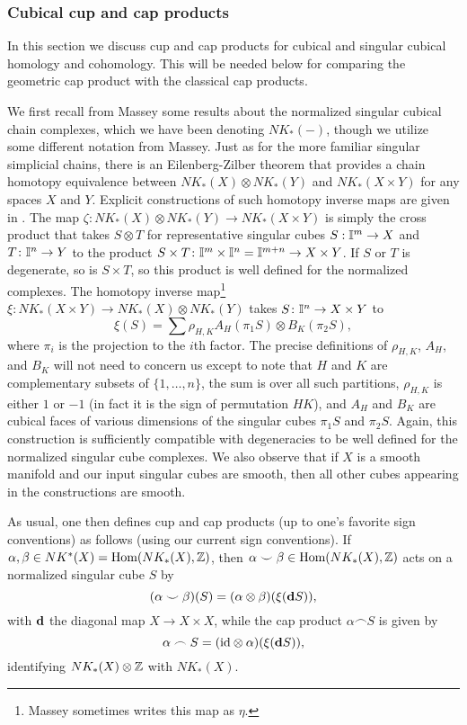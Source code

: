 \subsubsection{Cubical cup and cap products}\label{S: cubical products}

In this section we discuss cup and cap products for cubical and singular cubical homology and cohomology.
This will be needed below for comparing the geometric cap product with the classical cap products.

We first recall from Massey \cite[Chapter XI]{Mas91} some results about the normalized singular cubical chain complexes, which we have been denoting $NK_*(-)$, though we utilize some different notation from Massey.
Just as for the more familiar singular simplicial chains, there is an Eilenberg-Zilber theorem that provides a chain homotopy equivalence between $NK_*(X) \otimes NK_*(Y)$ and $NK_*(X \times Y)$ for any spaces $X$ and $Y$.
Explicit constructions of such homotopy inverse maps are given in \cite[Section XI.5]{Mas91}.
The map $\zeta: NK_*(X) \otimes NK_*(Y) \to NK_*(X \times Y)$ is simply the cross product that takes $S \otimes T$ for representative singular cubes $S: \mathbb{I}^m \to X$ and $T \colon \mathbb{I}^n \to Y$ to the product $S \times T \colon \mathbb{I}^m \times \mathbb{I}^n = \mathbb{I}^{m+n} \to X \times Y$.
If $S$ or $T$ is degenerate, so is $S \times T$, so this product is well defined for the normalized complexes.
The homotopy inverse map\footnote{Massey sometimes writes this map as $\eta$.} $\xi: NK_*(X \times Y) \to NK_*(X) \otimes NK_*(Y)$ takes $S \colon \mathbb{I}^n \to X \times Y$ to
$$\xi(S) = \sum \rho_{H,K}A_H(\pi_1S) \otimes B_K(\pi_2S),$$ where $\pi_i$ is the projection to the $i$th factor.
The precise definitions of $\rho_{H,K}$, $A_H$, and $B_K$ will not need to concern us except to note that $H$ and $K$ are complementary subsets of $\{1,\ldots, n\}$, the sum is over all such partitions, $\rho_{H,K}$ is either $1$ or $-1$ (in fact it is the sign of permutation $HK$), and $A_H$ and $B_K$ are cubical faces of various dimensions of the singular cubes $\pi_1S$ and $\pi_2S$.
Again, this construction is sufficiently compatible with degeneracies to be well defined for the normalized singular cube complexes.
We also observe that if $X$ is a smooth manifold and our input singular cubes are smooth, then all other cubes appearing in the constructions are smooth.

As usual, one then defines cup and cap products (up to one's favorite sign conventions) as follows (using our current sign conventions).
If $\alpha, \beta \in NK^*(X) = \textup{Hom}(NK_*(X),\mathbb{Z})$, then $\alpha\smile \beta \in \textup{Hom}(NK_*(X),\mathbb{Z})$ acts on a normalized singular cube $S$ by
\begin{equation}\label{E: cubical cup}
	(\alpha \smile \beta)(S) = (\alpha \otimes \beta)(\xi(\mathbf{d} S)),
\end{equation}
with $\mathbf{d}$ the diagonal map $X \to X \times X$,
while the cap product $\alpha\frown S$ is given by
\begin{equation}\label{E: cubical cap}
	\alpha\frown S = (\mathrm{id} \otimes \alpha) (\xi(\mathbf{d} S)),
\end{equation}
identifying $NK_*(X) \otimes \mathbb{Z}$ with $NK_*(X)$.

